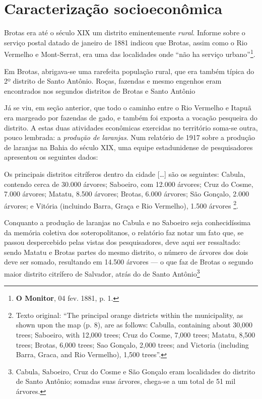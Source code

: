 \section{Caracterização socioeconômica}\label{sec:2.2}

Brotas era até o século XIX um distrito eminentemente \textit{rural}. Informe sobre o serviço postal datado de janeiro de 1881 indicou que Brotas, assim como o Rio Vermelho e Mont-Serrat, era uma das localidades onde ``não ha serviço urbano''\footnote{\textbf{O Monitor}, 04 fev. 1881, p. 1.}.

\begin{citacao}
Em Brotas, abrigava-se uma rarefeita população rural, que era também típica do 2º distrito de Santo Antônio. Roças, fazendas e mesmo engenhos eram encontrados nos segundos distritos de Brotas e Santo Antônio \cite[p.~52]{NASCIMENTO2007}
\end{citacao}

Já se viu, em seção anterior, que todo o caminho entre o Rio Vermelho e Itapuã era margeado por fazendas de gado, e também foi exposta a vocação pesqueira do distrito. A estas duas atividades econômicas exercidas no território soma-se outra, pouco lembrada: a \textit{produção de laranjas}. Num relatório de 1917 sobre a produção de laranjas na Bahia do século XIX, uma equipe estadunidense de pesquisadores apresentou os seguintes dados:

\begin{citacao}
Os principais distritos citríferos dentro da cidade [\dots] são os seguintes: Cabula, contendo cerca de 30.000 árvores; Saboeiro, com 12.000 árvores; Cruz do Cosme, 7.000 árvores; Matatu, 8.500 árvores; Brotas, 6.000 árvores; São Gonçalo, 2.000 árvores; e Vitória (incluindo Barra, Graça e Rio Vermelho), 1.500 árvores \cite[p.~3]{dorsett_orange_1917}\footnote{Texto original: ``The principal orange districts within the municipality, as shown upon the map (p. 8), are as follows: Cabulla, containing about 30,000 trees; Saboeiro, with 12,000 trees; Cruz do Cosme, 7,000 trees; Matatu, 8,500 trees; Brotas, 6,000 trees; Sao Gonçalo, 2,000 trees; and Victoria (including Barra, Graca, and Rio Vermelho), 1,500 trees''.}.
\end{citacao}

Conquanto a produção de laranjas no Cabula e no Saboeiro seja conhecidíssima da memória coletiva dos soteropolitanos, o relatório faz notar um fato que, se passou despercebido pelas vistas dos pesquisadores, deve aqui ser ressaltado: sendo Matatu e Brotas partes do mesmo distrito, o número de árvores dos dois deve ser somado, resultando em 14.500 árvores --- o que faz de Brotas o segundo maior distrito citrífero de Salvador, atrás do de Santo Antônio\footnote{Cabula, Saboeiro, Cruz do Cosme e São Gonçalo eram localidades do distrito de Santo Antônio; somadas suas árvores, chega-se a um total de 51 mil árvores.}

